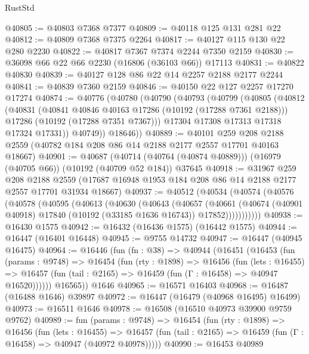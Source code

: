 \begin{lexlean}{RustStd}
\begin{coremodule}
@40805 := @40803 @7368 @7377
@40809 := @40118 @125 @131 @281 @22
@40812 := @40809 @7368 @7375 @2264
@40817 := @40127 @115 @130 @22 @280 @2230
@40822 := @40817 @7367 @7374 @2244 @7350 @2159
@40830 := @36098 @66 @22 @66 @2230 (@16806 (@36103 @66)) @17113
@40831 := @40822 @40830
@40839 := @40127 @128 @86 @22 @14 @2257 @2188 @2177 @2244
@40841 := @40839 @7360 @2159
@40846 := @40150 @22 @127 @2257 @17270 @17274
@40874 := @40776
    (@40780
      (@40790
        (@40793
          (@40799
            (@40805
              (@40812
                (@40831
                  (@40841 @40846 @40163 @17286 (@10192 (@17288 @7361 @2188)))
                  @17286
                  (@10192 (@17288 @7351 @7367)))
                @17304
                @17308
                @17313
                @17318
                @17324
                @17331))
            @40749))
        @18646))
@40889 := @40101
    @259
    @208
    @2188
    @2559
    (@40782 @184 @208 @86 @14 @2188 @2177 @2557 @17701 @40163 @18667)
@40901 := @40687
    (@40714 (@40764 (@40874 @40889)))
    (@16979 (@40705 @66))
    (@10192 (@40709 @52 @184))
    @37645
@40918 := @31967
    @259
    @208
    @2188
    @2559
    (@17687 @16948 @1953 @184 @208 @86 @14 @2188 @2177 @2557 @17701 @31934 @18667)
@40937 := @40512
    (@40534
      (@40574
        (@40576
          (@40578
            (@40595
              (@40613
                (@40630
                  (@40643
                    (@40657
                      (@40661
                        (@40674
                          (@40901 @40918)
                          @17840
                          (@10192 (@33185 @1636 @16743))
                          @17852)))))))))))
@40938 := @16430 @1575
@40942 := @16432 (@16436 @1575) (@16442 @1575)
@40944 := @16447 (@16401 @16448)
@40945 := @9755 @14732
@40947 := @16447 (@40945 @16475)
@40964 := @16446
    (fun (fn : @38) =>
    @40944
      (@16451
        (@16453
          (fun (params : @9748) =>
          @16454
            (fun (rty : @1898) =>
            @16456
              (fun (lets : @16455) =>
              @16457 (fun (tail : @2165) => @16459 (fun (Γ : @16458) => @40947 @16520))))))
        @16565))
    @1646
@40965 := @16571 @16403
@40968 := @16487 (@16488 @1646) @39897
@40972 := @16447 (@16479 (@40968 @16495) @16499)
@40973 := @16511 @1646
@40978 := @16508 (@16510 @40973 @39900 @9759 @9762)
@40989 := fun (params : @9748) =>
  @16454
    (fun (rty : @1898) =>
    @16456
      (fun (lets : @16455) =>
      @16457 (fun (tail : @2165) => @16459 (fun (Γ : @16458) => @40947 (@40972 @40978)))))
@40990 := @16453 @40989

\end{coremodule}
\end{lexlean}
